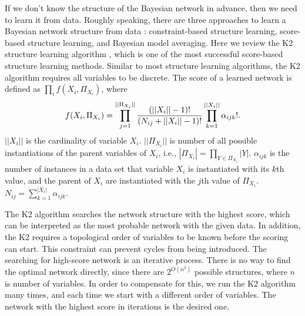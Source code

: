 If we don't know the structure of the Bayesian network in advance, then we need to learn it from data. Roughly speaking, there are three approaches to learn a Bayesian network structure from data \citep[see][chap.~18]{PGM_2009}: constraint-based structure learning, score-based structure learning, and Bayesian model averaging. Here we review the K2 structure learning algorithm \citep{K2}, which is one of the most successful score-based structure learning methods. Similar to most structure learning algorithms, the K2 algorithm requires all variables to be discrete. The score of a learned network is defined as $\prod_i f(X_i, \Pi_{X_i})$, where
\begin{align}
f(X_i, \Pi_{X_i}) = \prod_{j=1}^{||\Pi_{X_i}||} {{(||X_i||-1)!}\over{(N_{ij} + ||X_i||-1)!}} \prod_{k=1}^{||X_i||} \alpha_{ijk}!.
\end{align}
$||X_i||$ is the cardinality of variable $X_i$. $||\Pi_{X_i}||$ is number of all possible instantiations of the parent variables of $X_i$, i.e., $|\Pi_{X_i}| = \prod_{Y \in \Pi_{X_i}} |Y|$. $\alpha_{ijk}$ is the number of instances in a data set that variable $X_i$ is instantiated with its $k$th value, and the parent of $X_i$ are instantiated with the $j$th value of $\Pi_{X_i}$. $N_{ij} = \sum_{k=1}^{|X_i|} \alpha_{ijk}$. 

The K2 algorithm searches the network structure with the highest score, which can be interpreted as the most probable network with the given data. In addition, the K2 requires a topological order of variables to be known before the scoring can start. This constraint can prevent cycles from being introduced. The searching for high-score network is an iterative process. There is no way to find the optimal network directly, since there are $2^{O(n^2)}$ possible structures, where $n$ is number of variables. In order to compensate for this, we run the K2 algorithm many times, and each time we start with a different order of variables. The network with the highest score in iterations is the desired one.

